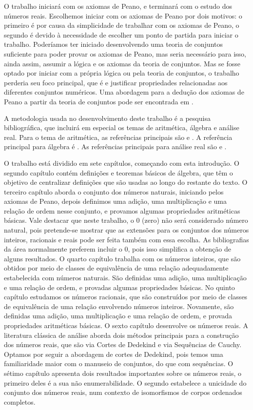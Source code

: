 \documentclass[../main.tex]{subfiles}
\begin{document}
O trabalho iniciará com os axiomas de Peano, e terminará com o estudo dos números reais. Escolhemos iniciar com os axiomas de Peano por dois motivos: o primeiro é por causa da simplicidade de trabalhar com os axiomas de Peano, o segundo é devido à necessidade de escolher um ponto de partida para iniciar o trabalho. Poderíamos ter iniciado desenvolvendo uma teoria de conjuntos suficiente para poder provar os axiomas de Peano, mas seria necessário para isso, ainda assim, assumir a lógica e os axiomas da teoria de conjuntos. Mas se fosse optado por iniciar com a própria lógica ou pela teoria de conjuntos, o trabalho perderia seu foco principal, que é e justificar propriedades relacionadas aos diferentes conjuntos numéricos. Uma abordagem para a dedução dos axiomas de Peano a partir da teoria de conjuntos pode ser encontrada em \textcite{suppes}.

A metodologia usada no desenvolvimento deste trabalho é a pesquisa bibliográfica, que incluirá em especial os temas de aritmética, álgebra e análise real. Para o tema de aritmética, as referências principais são \textcite{ferreira} e \textcite{domingues-2009}. A referência principal para álgebra é \textcite{domingues-iezzi-2018}. As referências principais para análise real são \textcite{guidorizzi} e \textcite{lima-analise-1}.

O trabalho está dividido em sete capítulos, começando com esta introdução. O segundo capítulo contém definições e teoremas básicos de álgebra, que têm o objetivo de centralizar definições que são usadas ao longo do restante do texto. O terceiro capítulo aborda o conjunto dos números naturais, iniciando pelos axiomas de Peano, depois definimos uma adição, uma multiplicação e uma relação de ordem nesse conjunto, e provamos algumas propriedades aritméticas básicas. Vale destacar que neste trabalho, o $0$ (zero) não será considerado número natural, pois pretende-se mostrar que as extensões para os conjuntos dos números inteiros, racionais e reais pode ser feita também com essa escolha. As bibliografias da área normalmente preferem incluir o $0$, pois isso simplifica a obtenção de alguns resultados. O quarto capítulo trabalha com os números inteiros, que são obtidos por meio de classes de equivalência de uma relação adequadamente estabelecida com números naturais. São definidas uma adição, uma multiplicação e uma relação de ordem, e provadas algumas propriedades básicas. No quinto capítulo estudamos os números racionais, que são construídos por meio de classes de equivalência de uma relação envolvendo números inteiros. Novamente, são definidas uma adição, uma multiplicação e uma relação de ordem, e provada propriedades aritméticas básicas. O sexto capítulo desenvolve os números reais. A literatura clássica de análise aborda dois métodos principais para a construção dos números reais, que são via Cortes de Dedekind e via Sequências de Cauchy. Optamos por seguir a abordagem de cortes de Dedekind, pois temos uma familiaridade maior com o manuseio de conjuntos, do que com sequências. O sétimo capítulo apresenta dois resultados importantes sobre os números reais, o primeiro deles é a sua não enumerabilidade. O segundo estabelece a unicidade do conjunto dos números reais, num contexto de isomorfismos de corpos ordenados completos. 

\end{document}
